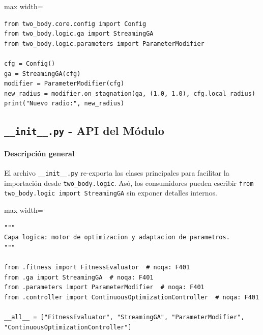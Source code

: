 \begin{listing}[H]
\caption{Ejemplo de reseed tras estancamiento}
\begin{adjustbox}{max width=\textwidth}
\begin{minipage}{\textwidth}
\begin{verbatim}
from two_body.core.config import Config
from two_body.logic.ga import StreamingGA
from two_body.logic.parameters import ParameterModifier

cfg = Config()
ga = StreamingGA(cfg)
modifier = ParameterModifier(cfg)
new_radius = modifier.on_stagnation(ga, (1.0, 1.0), cfg.local_radius)
print("Nuevo radio:", new_radius)
\end{verbatim}
\end{minipage}
\end{adjustbox}
\end{listing}

\subsection{\texttt{\_\_init\_\_.py} \-- API del Módulo}
\paragraph{Descripción general}
El archivo \texttt{\_\_init\_\_.py} re-exporta las clases principales para facilitar la importación desde \texttt{two\_body.logic}. Asó, los consumidores pueden escribir \texttt{from two\_body.logic import StreamingGA} sin exponer detalles internos.

\begin{listing}[H]
\caption{Bloque de código de \texttt{logic.\_\_init\_\_.py}}
\begin{adjustbox}{max width=\textwidth}
\begin{minipage}{\textwidth}
\begin{verbatim}
"""
Capa logica: motor de optimizacion y adaptacion de parametros.
"""

from .fitness import FitnessEvaluator  # noqa: F401
from .ga import StreamingGA  # noqa: F401
from .parameters import ParameterModifier  # noqa: F401
from .controller import ContinuousOptimizationController  # noqa: F401

__all__ = ["FitnessEvaluator", "StreamingGA", "ParameterModifier", "ContinuousOptimizationController"]
\end{verbatim}
\end{minipage}
\end{adjustbox}
\end{listing}

